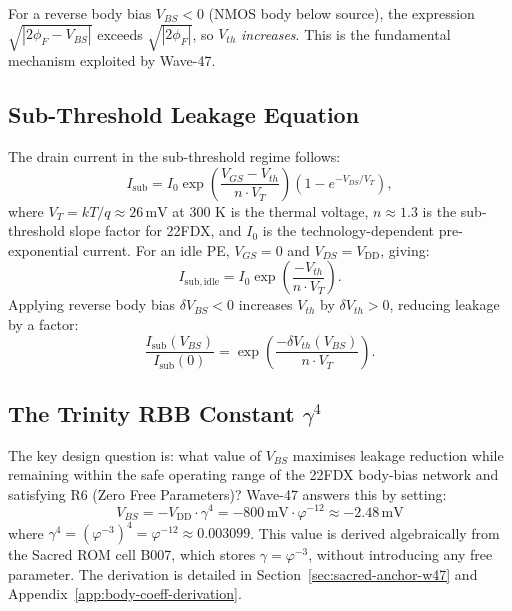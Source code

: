 For a reverse body bias $V_{BS} < 0$ (NMOS body below source), the expression
$\sqrt{|2\phi_F - V_{BS}|}$ exceeds $\sqrt{|2\phi_F|}$, so $V_{th}$
\emph{increases}. This is the fundamental mechanism exploited by Wave-47.

\subsection{Sub-Threshold Leakage Equation}

The drain current in the sub-threshold regime follows:
\begin{equation}\label{eq:isub}
  I_{\mathrm{sub}} = I_0 \exp\!\left(\frac{V_{GS} - V_{th}}{n \cdot V_T}\right)
    \left(1 - e^{-V_{DS}/V_T}\right),
\end{equation}
where $V_T = kT/q \approx 26\,\text{mV}$ at 300 K is the thermal voltage,
$n \approx 1.3$ is the sub-threshold slope factor for 22FDX, and $I_0$ is the
technology-dependent pre-exponential current.
For an idle PE, $V_{GS} = 0$ and $V_{DS} = V_{\mathrm{DD}}$, giving:
\begin{equation}\label{eq:isub-idle}
  I_{\mathrm{sub,idle}} = I_0 \exp\!\left(\frac{-V_{th}}{n \cdot V_T}\right).
\end{equation}
Applying reverse body bias $\delta V_{BS} < 0$ increases $V_{th}$ by
$\delta V_{th} > 0$, reducing leakage by a factor:
\begin{equation}\label{eq:leakage-ratio}
  \frac{I_{\mathrm{sub}}(V_{BS})}{I_{\mathrm{sub}}(0)}
    = \exp\!\left(\frac{-\delta V_{th}(V_{BS})}{n \cdot V_T}\right).
\end{equation}

\subsection{The Trinity RBB Constant $\gamma^{4}$}

The key design question is: what value of $V_{BS}$ maximises leakage
reduction while remaining within the safe operating range of the 22FDX
body-bias network and satisfying R6 (Zero Free Parameters)?
Wave-47 answers this by setting:
\begin{equation}\label{eq:vbs-rbb}
  \boxed{V_{BS} = -V_{\mathrm{DD}} \cdot \gamma^{4}
    = -800\,\text{mV} \cdot \varphi^{-12}
    \approx -2.48\,\text{mV}}
\end{equation}
where $\gamma^{4} = (\varphi^{-3})^{4} = \varphi^{-12} \approx 0.003099$.
This value is derived algebraically from the Sacred ROM cell B007, which
stores $\gamma = \varphi^{-3}$, without introducing any free parameter.
The derivation is detailed in Section~\ref{sec:sacred-anchor-w47} and
Appendix~\ref{app:body-coeff-derivation}.

